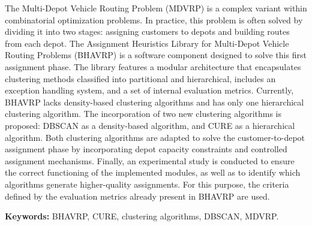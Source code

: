 \documentclass[12pt,letterpaper,oneside]{report}
\begin{document}
The Multi-Depot Vehicle Routing Problem (MDVRP) is a complex variant within combinatorial optimization problems. In practice, this problem is often solved by dividing it into two stages: assigning customers to depots and building routes from each depot. The Assignment Heuristics Library for Multi-Depot Vehicle Routing Problems (BHAVRP) is a software component designed to solve this first assignment phase. The library features a modular architecture that encapsulates clustering methods classified into partitional and hierarchical, includes an exception handling system, and a set of internal evaluation metrics. Currently, BHAVRP lacks density-based clustering algorithms and has only one hierarchical clustering algorithm. The incorporation of two new clustering algorithms is proposed: DBSCAN as a density-based algorithm, and CURE as a hierarchical algorithm. Both clustering algorithms are adapted to solve the customer-to-depot assignment phase by incorporating depot capacity constraints and controlled assignment mechanisms. Finally, an experimental study is conducted to ensure the correct functioning of the implemented modules, as well as to identify which algorithms generate higher-quality assignments. For this purpose, the criteria defined by the evaluation metrics already present in BHAVRP are used.

\vspace{12pt}
\noindent\textbf{Keywords:} BHAVRP, CURE, clustering algorithms, DBSCAN, MDVRP.

\tableofcontents
\listoffigures
\listoftables

\clearpage
{}
\setcounter{page}{1}





\end{document}
